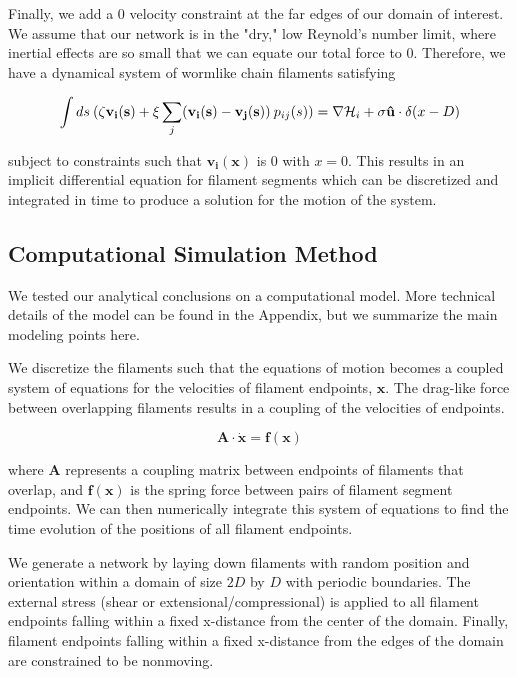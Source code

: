 \documentclass[pre,preprint]{revtex4-1}
\begin{document}
Finally, we add a 0 velocity constraint at the far edges of our domain of interest.  We assume that our network is in the "dry," low Reynold's number limit, where inertial effects are so small that we can equate our total force to 0.  Therefore, we have a dynamical system of wormlike chain filaments satisfying 

\begin{equation}
\int ds \: (\zeta\mathbf{v_i(s)} + \xi \sum _j(\mathbf{v_i(s)}-\mathbf{v_j(s)}) \: p_{ij}(s)) = \nabla {\cal H}_i + \sigma\mathbf{\hat{u}}\cdot\delta(x-D)
\end{equation}

subject to constraints such that $\mathbf{v_i(x)}$ is 0 with $x=0$.  This results in an implicit differential equation for filament segments which can be discretized and integrated in time to produce a solution for the motion of the system.


\subsection{Computational Simulation Method}

We tested our analytical conclusions on a computational model.  More technical details of the model can be found in the Appendix, but we summarize the main modeling points here.

We discretize the filaments such that the equations of motion becomes a coupled system of equations for the velocities of filament endpoints, $\mathbf{x}$.  The drag-like force between overlapping filaments results in a coupling of the velocities of endpoints.  

\begin{equation}
\mathbf{A \cdot \dot x} = \mathbf{f(x)}
\end{equation}

where $\mathbf{A }$ represents a coupling matrix between endpoints of filaments that overlap, and $\mathbf{f(x)}$ is the spring force between pairs of filament segment endpoints.  We can then numerically integrate this system of equations to find the time evolution of the positions of all filament endpoints.

We generate a network by laying down filaments with random position and orientation within a domain of size $2D$ by $D$ with periodic boundaries.  The external stress (shear or extensional/compressional) is applied to all filament endpoints falling within a fixed x-distance from the center of the domain.  Finally, filament endpoints falling within a fixed x-distance from the edges of the domain are constrained to be nonmoving.
\end{document}

